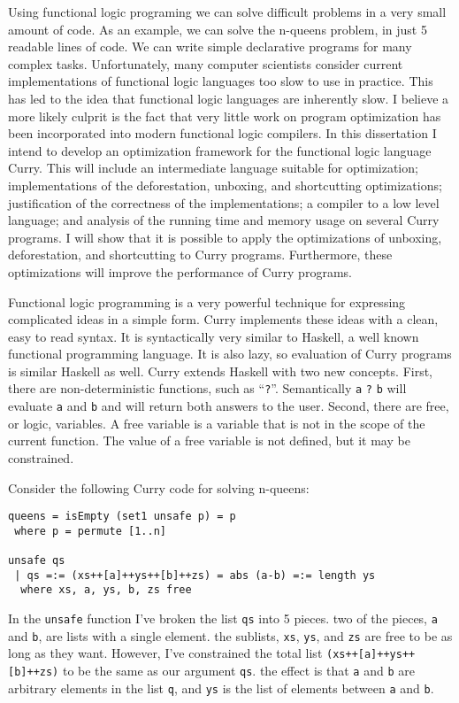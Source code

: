 
Using functional logic programing we can solve difficult problems in a very small amount of code.
As an example, we can solve the n-queens problem, in just 5 readable lines of code.
We can write simple declarative programs for many complex tasks.
Unfortunately, many computer scientists consider current implementations of functional logic languages
too slow to use in practice.
This has led to the idea that functional logic languages are inherently slow.
I believe a more likely culprit is the fact that very little work on program optimization 
has been incorporated into modern functional logic compilers.
In this dissertation I intend to develop an optimization framework for the functional logic language Curry.
This will include an intermediate language suitable for optimization;
implementations of the deforestation, unboxing, and shortcutting optimizations;
justification of the correctness of the implementations;
a compiler to a low level language;
and analysis of the running time and memory usage on several Curry programs.
I will show that it is possible to apply the optimizations of unboxing, deforestation, and shortcutting to Curry programs.
Furthermore, these optimizations will improve the performance of Curry programs.

Functional logic programming is a very powerful technique for expressing complicated ideas in a simple form.
Curry implements these ideas with a clean, easy to read syntax.
It is syntactically very similar to Haskell, a well known functional programming language.
It is also lazy, so evaluation of Curry programs is similar Haskell as well.
Curry extends Haskell with two new concepts.
First, there are non-deterministic functions, such as ``\texttt{?}''.  
Semantically \texttt{a} \texttt{?} \texttt{b} will evaluate \texttt{a} and \texttt{b} and will return both answers to the user.
Second, there are free, or logic, variables.
A free variable is a variable that is not in the scope of the current function.
The value of a free variable is not defined, but it may be constrained.

Consider the following Curry code for solving n-queens:
\begin{verbatim}
queens = isEmpty (set1 unsafe p) = p
 where p = permute [1..n]

unsafe qs
 | qs =:= (xs++[a]++ys++[b]++zs) = abs (a-b) =:= length ys
  where xs, a, ys, b, zs free
\end{verbatim}
In the \texttt{unsafe} function I've broken the list \texttt{qs} into 5 pieces.
two of the pieces, \texttt{a} and \texttt{b}, are lists with a single element.
the sublists, \texttt{xs}, \texttt{ys}, and \texttt{zs} are free to be as long as they want.
However, I've constrained the total list \texttt{(xs++[a]++ys++[b]++zs)}
to be the same as our argument \texttt{qs}.
the effect is that \texttt{a} and \texttt{b} are arbitrary elements in the list \texttt{q},
and \texttt{ys} is the list of elements between \texttt{a} and \texttt{b}.

